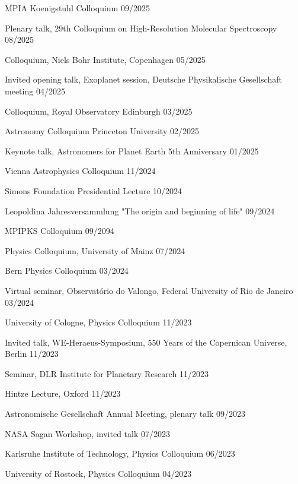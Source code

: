\documentclass[12pt,letterpaper]{article}
\begin{document}
\begin{list}{}{\cvlist}
\item {MPIA Koenigstuhl Colloquium \hfill 09/2025}
\item {Plenary talk, 29th Colloquium on High-Resolution Molecular Spectroscopy \hfill 08/2025}
\item {Colloquium, Niels Bohr Institute, Copenhagen \hfill 05/2025}
\item {Invited opening talk, Exoplanet session, Deutsche Physikalische Gesellschaft meeting \hfill 04/2025}
\item {Colloquium, Royal Observatory Edinburgh \hfill 03/2025}
\item {Astronomy Colloquium Princeton University \hfill 02/2025}
\item {Keynote talk, Astronomers for Planet Earth 5th Anniversary \hfill 01/2025}
\item {Vienna Astrophysics Colloquium \hfill 11/2024}
\item {Simons Foundation Presidential Lecture \hfill 10/2024}
\item {Leopoldina Jahresversammlung "The origin and beginning of life" \hfill 09/2024}
\item {MPIPKS Colloquium \hfill 09/2094}
\item {Physics Colloquium, University of Mainz \hfill 07/2024}
\item {Bern Physics Colloquium \hfill 03/2024}
\item {Virtual seminar, Observatório do Valongo, Federal University of Rio de Janeiro \hfill 03/2024}
\item {University of Cologne, Physics Colloquium \hfill 11/2023}
\item {Invited talk, WE-Heraeus-Symposium, 550 Years of the Copernican Universe, Berlin \hfill 11/2023}
\item {Seminar, DLR Institute for Planetary Research \hfill 11/2023}
\item {Hintze Lecture, Oxford \hfill 11/2023}
\item {Astronomische Gesellschaft Annual Meeting, plenary talk \hfill 09/2023}
\item {NASA Sagan Workshop, invited talk \hfill 07/2023}
\item {Karlsruhe Institute of Technology, Physics Colloquium \hfill 06/2023}
\item {University of Rostock, Physics Colloquium \hfill 04/2023}

\end{list}
\end{document}
